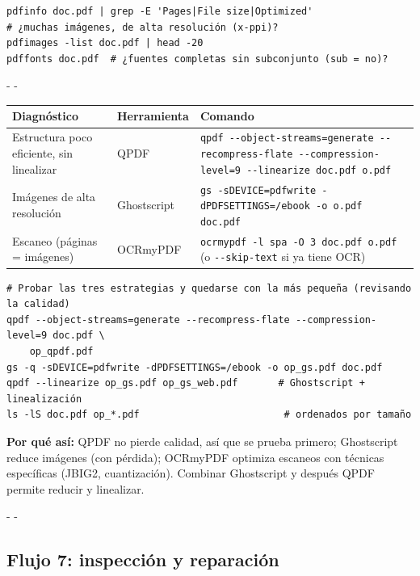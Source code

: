 \documentclass[11pt,a4paper]{article}
\makeatletter
\newcommand{\necesitaespacio}[1]{\par\penalty-100\begingroup
	\setlength{\dimen@}{#1}\dimen@ii\pagegoal\advance\dimen@ii-\pagetotal
	\ifdim\dimen@>\dimen@ii\ifdim\dimen@ii>\z@\vfil\fi\penalty-\@M\fi\endgroup}
\newcommand{\cmd}[1]{\texttt{\textcolor{colcmd}{#1}}}      %
\newcommand{\opt}[1]{\texttt{\textcolor{colopt}{#1}}}      %
\newcommand{\cab}[1]{\textbf{#1}}
\makeatother
\begin{document}
	\begin{lstlisting}
pdfinfo doc.pdf | grep -E 'Pages|File size|Optimized'
# ¿muchas imágenes, de alta resolución (x-ppi)?
pdfimages -list doc.pdf | head -20
pdffonts doc.pdf  # ¿fuentes completas sin subconjunto (sub = no)?
\end{lstlisting}
	
	\begingroup\small
	\necesitaespacio{13\baselineskip}
	\begin{longtable}{L{4.4cm}L{2.6cm}L{8.06cm}}
		\toprule{}\cab{Diagnóstico} & \cab{Herramienta} & \cab{Comando}\\\midrule
		\endfirsthead
		\bottomrule
		\endfoot
		Estructura poco eficiente, sin linealizar & QPDF & \cmd{qpdf -{}-object-\allowbreak{}streams=\allowbreak{}generate -{}-recompress-\allowbreak{}flate -{}-compression-\allowbreak{}level=\allowbreak{}9 -{}-linearize doc.pdf o.pdf}\\*
		Imágenes de alta resolución & Ghostscript & \cmd{gs -sDEVICE=\allowbreak{}pdfwrite -dPDFSETTINGS=\allowbreak{}/\allowbreak{}ebook -o o.pdf doc.pdf}\\*
		Escaneo (páginas = imágenes) & OCRmyPDF & \cmd{ocrmypdf -l spa -O 3 doc.pdf o.pdf} (o \opt{-{}-skip-text} si ya tiene OCR)\\
	\end{longtable}
	\endgroup
	
	\begin{lstlisting}
# Probar las tres estrategias y quedarse con la más pequeña (revisando la calidad)
qpdf --object-streams=generate --recompress-flate --compression-level=9 doc.pdf \
    op_qpdf.pdf
gs -q -sDEVICE=pdfwrite -dPDFSETTINGS=/ebook -o op_gs.pdf doc.pdf
qpdf --linearize op_gs.pdf op_gs_web.pdf       # Ghostscript + linealización
ls -lS doc.pdf op_*.pdf                         # ordenados por tamaño
\end{lstlisting}
	
	\textbf{Por qué así:} QPDF no pierde calidad, así que se prueba primero; Ghostscript reduce imágenes (con pérdida); OCRmyPDF optimiza escaneos con técnicas específicas (JBIG2, cuantización). Combinar Ghostscript y después QPDF permite reducir y linealizar.
	
	\necesitaespacio{8\baselineskip}
	\subsection{Flujo 7: inspección y reparación}\label{sec:flujo7}
	
\end{document}
